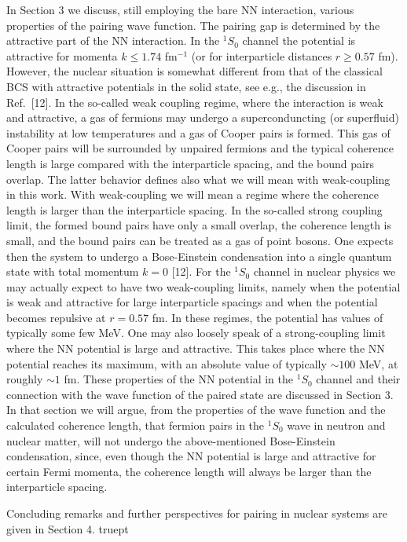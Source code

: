 In Section 3 we discuss, still employing the bare NN interaction,
various properties of the pairing wave function.  
The pairing gap is determined by the attractive part
of the NN interaction. In the $^1S_0$ channel 
the potential is attractive for momenta $k \leq 1.74$ fm$^{-1}$
(or for interparticle distances $r \geq 0.57$ fm). However,
the nuclear situation is somewhat different from that of the classical BCS with
attractive potentials in the solid state, see e.g., the discussion in 
Ref.\ [12]. 
In the so-called weak coupling regime, where the 
interaction is weak and attractive,  a
gas of fermions may undergo a superconduncting (or superfluid) 
instability at low temperatures and a gas of Cooper pairs is formed.   
This gas of Cooper pairs will be surrounded by unpaired fermions and
the typical coherence length is large compared with the interparticle
spacing, and the bound pairs overlap. The latter behavior defines
also what we will mean with weak-coupling in this work. With weak-coupling
we will mean a regime where the coherence length is larger than the 
interparticle spacing.
In the so-called strong coupling limit, the formed bound pairs have only a small
overlap, the coherence length is small, and the bound pairs
can be treated as a gas of point bosons. One expects then the system
to undergo a Bose-Einstein condensation into a single quantum
state with total momentum $k=0$ [12].  
For the $^1S_0$ channel in nuclear physics we may actually expect to have 
two weak-coupling limits,
namely when the potential is weak and attractive for large interparticle
spacings and when the potential becomes repulsive at $r=0.57$ fm.
In these regimes, the potential has values of typically some few
MeV. One may also loosely speak of a strong-coupling limit 
where the NN potential is large 
and attractive. This takes place where the NN potential
reaches its maximum, with an absolute value of typically $\sim 100$ MeV, 
at roughly $\sim 1$ fm. 
These properties of the NN potential in the $^1S_0$ channel
and their connection with the wave function of the paired state
are discussed in Section 3. In that section we will argue, from the properties
of the wave function and the calculated coherence length, that 
fermion pairs in the $^1S_0$ wave in neutron and nuclear matter, will not
undergo the above-mentioned Bose-Einstein condensation, since, even though
the NN potential is large and attractive for certain Fermi momenta, the 
coherence length will always be larger than the interparticle spacing.

Concluding remarks and further
perspectives for pairing in nuclear systems are given in Section 4.
 truept

